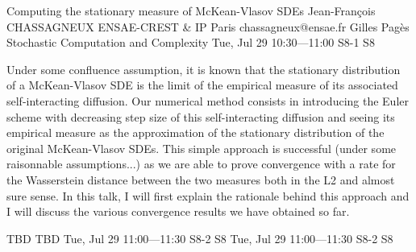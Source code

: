 \begin{talk}
  {Computing the stationary measure of McKean-Vlasov SDEs}%
  {Jean-Fran\c{c}ois CHASSAGNEUX}%
  {ENSAE-CREST \& IP Paris}%
  {chassagneux@ensae.fr}%
  {Gilles Pag\`es}%
  {Stochastic Computation and Complexity}%
  {Tue, Jul 29 10:30---11:00}%
  {S8-1}%
  {S8}%
    
   
Under some confluence assumption, it is known that the stationary distribution of a McKean-Vlasov SDE is the limit of the empirical measure of its associated self-interacting diffusion. 
Our numerical method consists in introducing the Euler scheme with decreasing step size of this self-interacting diffusion and seeing its empirical measure as the approximation of the stationary distribution of the original McKean-Vlasov SDEs.
This simple approach is successful (under some raisonnable assumptions...) as we are able to prove convergence with a rate for the Wasserstein distance between the two measures both in the L2 and almost sure sense. In this talk, I will first explain the rationale behind this approach and  I will discuss the various convergence results we have obtained so far.





\end{talk}

\begin{talk}
  {TBD}%
  {TBD}%
  {Tue, Jul 29 11:00---11:30}%
  {S8-2}%
  {S8}%
  {}%
  {Tue, Jul 29 11:00---11:30}%
  {S8-2}%
  {S8}%
\end{talk}

